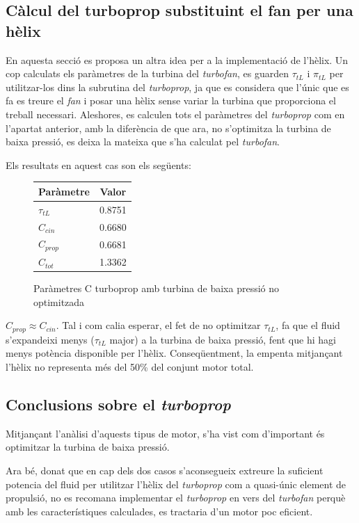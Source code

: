 \subsection{Càlcul del turboprop substituint el fan per una hèlix}
En aquesta secció es proposa un altra idea per a la implementació de l'hèlix. Un cop calculats els paràmetres de la turbina del \textit{turbofan}, es guarden $\tau_{tL}$ i $\pi_{tL}$  per utilitzar-los dins la subrutina del \textit{turboprop}, ja que es considera que l'únic que es fa es treure el \textit{fan} i posar una hèlix sense variar la turbina que proporciona el treball necessari. Aleshores, es calculen tots el paràmetres del \textit{turboprop} com en l'apartat anterior, amb la diferència de que ara, no s'optimitza la turbina de baixa pressió, es deixa la mateixa que s'ha calculat pel \textit{turbofan}.

\noindent Els resultats en aquest cas son els següents:
\begin{figure}[H]
	\centering
	\begin{tabular}{lc}
		\toprule[3pt]
		\textbf{Paràmetre}&\textbf{Valor}\\
		\midrule[1pt]
		$\tau_{tL}$ & 0.8751\\
		$C_{cin}$ & 0.6680\\
		$C_{prop}$ & 0.6681\\
		$C_{tot}$ & 1.3362\\
		
		\bottomrule[2pt]
	\end{tabular}
	\label{C_opti2}
	\caption{Paràmetres C turboprop amb turbina de baixa pressió no optimitzada}
\end{figure}
\noindent $C_{prop}\approx C_{cin}$. Tal i com calia esperar, el fet de no optimitzar $\tau_{tL}$, fa que el fluid s'expandeixi menys ($\tau_{tL}$ major) a la turbina de baixa pressió, fent que hi hagi menys potència disponible per l'hèlix. Conseqüentment, la empenta mitjançant l'hèlix no representa més del 50\% del conjunt motor total.

\subsection{Conclusions sobre el \textit{turboprop}}
Mitjançant l'anàlisi d'aquests tipus de motor, s'ha vist com d'important és optimitzar la turbina de baixa pressió.

\noindent Ara bé, donat que en cap dels dos casos s'aconsegueix extreure la suficient potencia del fluid per utilitzar l'hèlix del \textit{turboprop} com a quasi-únic element de propulsió, no es recomana implementar el \textit{turboprop} en vers del \textit{turbofan} perquè amb les característiques calculades, es tractaria d'un motor poc eficient.

